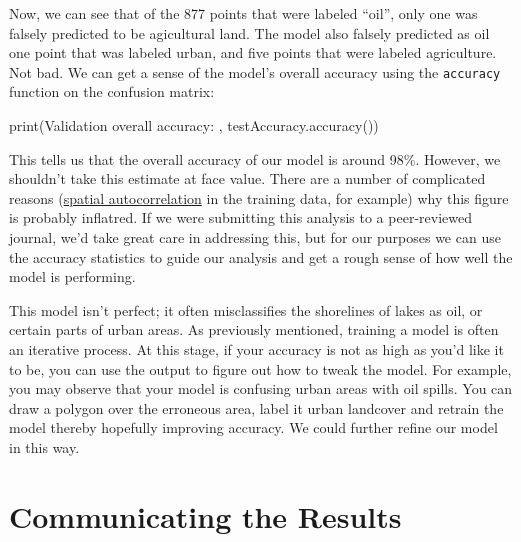 \documentclass[
  letterpaper,
  DIV=11,
  numbers=noendperiod]{scrreprt}
\newenvironment{Shaded}{\begin{snugshade}}{\end{snugshade}}
\newcommand{\FunctionTok}[1]{\textcolor[rgb]{0.28,0.35,0.67}{#1}}
\newcommand{\NormalTok}[1]{\textcolor[rgb]{0.00,0.23,0.31}{#1}}
\newcommand{\OperatorTok}[1]{\textcolor[rgb]{0.37,0.37,0.37}{#1}}
\newcommand{\StringTok}[1]{\textcolor[rgb]{0.13,0.47,0.30}{#1}}
\begin{document}
Now, we can see that of the 877 points that were labeled ``oil'', only
one was falsely predicted to be agicultural land. The model also falsely
predicted as oil one point that was labeled urban, and five points that
were labeled agriculture. Not bad. We can get a sense of the model's
overall accuracy using the \texttt{accuracy} function on the confusion
matrix:

\begin{Shaded}
\begin{Highlighting}[]
\FunctionTok{print}\NormalTok{(}\StringTok{\textquotesingle{}Validation overall accuracy: \textquotesingle{}}\OperatorTok{,}\NormalTok{ testAccuracy}\OperatorTok{.}\FunctionTok{accuracy}\NormalTok{())}
\end{Highlighting}
\end{Shaded}

This tells us that the overall accuracy of our model is around 98\%.
However, we shouldn't take this estimate at face value. There are a
number of complicated reasons
(\href{https://www.sciencedirect.com/topics/computer-science/spatial-autocorrelation\#:~:text=Spatial\%20autocorrelation\%20is\%20the\%20term,together\%20to\%20have\%20similar\%20values.}{spatial
autocorrelation} in the training data, for example) why this figure is
probably inflatred. If we were submitting this analysis to a
peer-reviewed journal, we'd take great care in addressing this, but for
our purposes we can use the accuracy statistics to guide our analysis
and get a rough sense of how well the model is performing.

This model isn't perfect; it often misclassifies the shorelines of lakes
as oil, or certain parts of urban areas. As previously mentioned,
training a model is often an iterative process. At this stage, if your
accuracy is not as high as you'd like it to be, you can use the output
to figure out how to tweak the model. For example, you may observe that
your model is confusing urban areas with oil spills. You can draw a
polygon over the erroneous area, label it urban landcover and retrain
the model thereby hopefully improving accuracy. We could further refine
our model in this way.

\hypertarget{communicating-the-results}{%
\chapter*{Communicating the Results}\label{communicating-the-results}}
\end{document}
